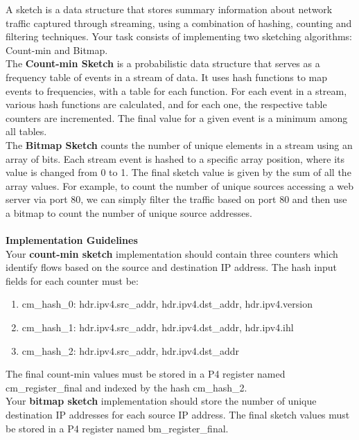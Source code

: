 A sketch is a data structure that stores summary information about network traffic captured through streaming, using a combination of hashing, counting and filtering techniques. Your task consists of implementing two sketching algorithms: Count-min and Bitmap.\\
The \textbf{Count-min Sketch} is a probabilistic data structure that serves as a frequency table of events in a stream of data. It uses hash functions to map events to frequencies, with a table for each function. For each event in a stream, various hash functions are calculated, and for each one, the respective table counters are incremented. The final value for a given event is a minimum among all tables.\\
The \textbf{Bitmap Sketch} counts the number of unique elements in a stream using an array of bits. Each stream event is hashed to a specific array position, where its value is changed from 0 to 1. The final sketch value is given by the sum of all the array values. For example, to count the number of unique sources accessing a web server via port 80, we can simply filter the traffic based on port 80 and then use a bitmap to count the number of unique source addresses.\\
~\\
\textbf{Implementation Guidelines}\\
Your \textbf{count-min sketch} implementation should contain three counters which identify flows based on the source and destination IP address. The hash input fields for each counter must be:
\begin{enumerate}
    \item cm\_hash\_0: hdr.ipv4.src\_addr, hdr.ipv4.dst\_addr, hdr.ipv4.version
    \item cm\_hash\_1: hdr.ipv4.src\_addr, hdr.ipv4.dst\_addr, hdr.ipv4.ihl
    \item cm\_hash\_2: hdr.ipv4.src\_addr, hdr.ipv4.dst\_addr   
\end{enumerate}

The final count-min values must be stored in a P4 register named cm\_register\_final and indexed by the hash cm\_hash\_2.\\

Your \textbf{bitmap sketch} implementation should store the number of unique destination IP addresses for each source IP address. The final sketch values must be stored in a P4 register named bm\_register\_final.\\

